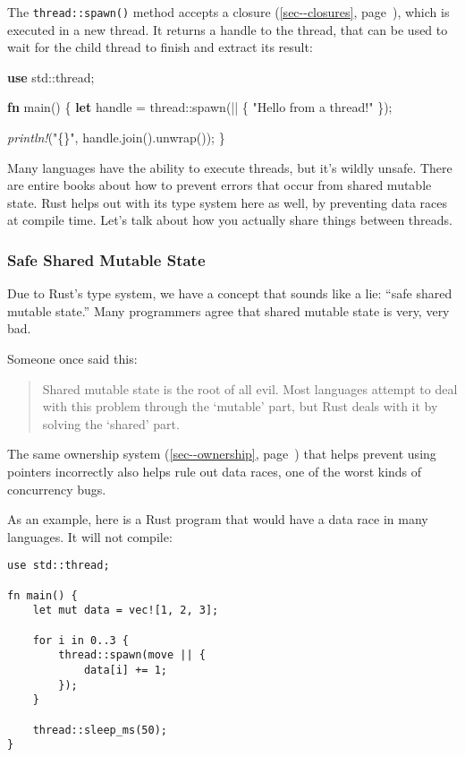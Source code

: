 \documentclass[a4paper,]{book}
\renewcommand*{\hyperref}[2][\ar]{%
  \def\ar{#2}%
  #2 (\autoref{#1}, page~\pageref{#1})}
\newenvironment{Shaded}{\begin{snugshade}}{\end{snugshade}}
\newcommand{\KeywordTok}[1]{\textcolor[rgb]{0.13,0.29,0.53}{\textbf{{#1}}}}
\newcommand{\StringTok}[1]{\textcolor[rgb]{0.31,0.60,0.02}{{#1}}}
\newcommand{\PreprocessorTok}[1]{\textcolor[rgb]{0.56,0.35,0.01}{\textit{{#1}}}}
\newcommand{\NormalTok}[1]{{#1}}
\begin{document}
The \texttt{thread::spawn()} method accepts a
\hyperref[sec--closures]{closure}, which is executed in a new thread. It
returns a handle to the thread, that can be used to wait for the child
thread to finish and extract its result:

\begin{Shaded}
\begin{Highlighting}[]
\KeywordTok{use} \NormalTok{std::thread;}

\KeywordTok{fn} \NormalTok{main() \{}
    \KeywordTok{let} \NormalTok{handle = thread::spawn(|| \{}
        \StringTok{"Hello from a thread!"}
    \NormalTok{\});}

    \PreprocessorTok{println!}\NormalTok{(}\StringTok{"\{\}"}\NormalTok{, handle.join().unwrap());}
\NormalTok{\}}
\end{Highlighting}
\end{Shaded}

Many languages have the ability to execute threads, but it's wildly
unsafe. There are entire books about how to prevent errors that occur
from shared mutable state. Rust helps out with its type system here as
well, by preventing data races at compile time. Let's talk about how you
actually share things between threads.

\subsubsection{Safe Shared Mutable
State}\label{safe-shared-mutable-state}

Due to Rust's type system, we have a concept that sounds like a lie:
``safe shared mutable state.'' Many programmers agree that shared
mutable state is very, very bad.

Someone once said this:

\begin{quote}
Shared mutable state is the root of all evil. Most languages attempt to
deal with this problem through the `mutable' part, but Rust deals with
it by solving the `shared' part.
\end{quote}

The same \hyperref[sec--ownership]{ownership system} that helps prevent
using pointers incorrectly also helps rule out data races, one of the
worst kinds of concurrency bugs.

As an example, here is a Rust program that would have a data race in
many languages. It will not compile:

\begin{verbatim}
use std::thread;

fn main() {
    let mut data = vec![1, 2, 3];

    for i in 0..3 {
        thread::spawn(move || {
            data[i] += 1;
        });
    }

    thread::sleep_ms(50);
}
\end{verbatim}
\end{document}
